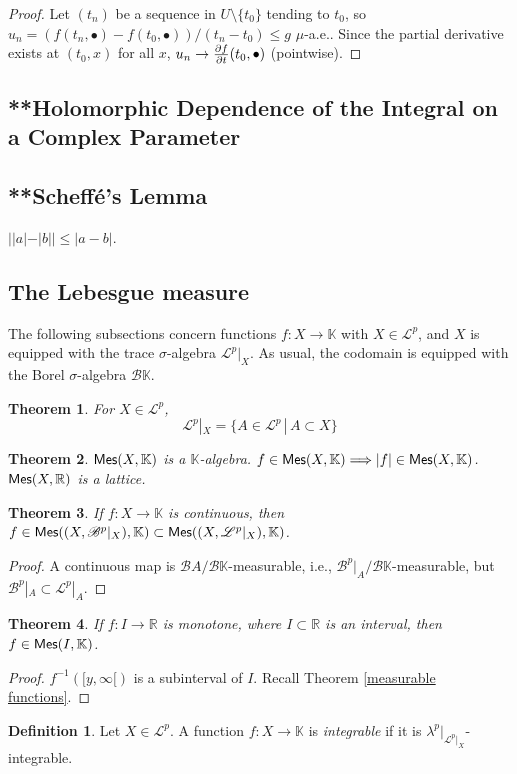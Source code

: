 \documentclass[11pt, a4paper, openany]{book}
\newtheorem{thm}{Theorem}\newtheorem{lem}{Lemma}\newtheorem{crl}{Corollary}
\theoremstyle{definition}
\newtheorem{define}{Definition}\newtheorem{exam}{Example}\newtheorem{remark}{Remark}
\newcommand{\cat}[1]{\textup{\textsf{#1}}}
\begin{document}
    \begin{proof}
        Let $(t_n)$ be a sequence in $U\setminus \{t_0\}$ tending to $t_0$, so $u_n=(f(t_n,\bullet)-f(t_0,\bullet))/(t_n-t_0)\leqslant g$ $\mu$-a.e.. Since the partial derivative exists at $(t_0,x)$ for all $x$, $u_n\to\pdv{f}{t}(t_0,\bullet)$ (pointwise).
    \end{proof}
\subsection{**Holomorphic Dependence of the Integral on a Complex Parameter}
\subsection{**Scheff\'{e}'s Lemma}
    $||a|-|b||\leqslant |a-b|$.
\subsection{The Lebesgue measure}
    The following subsections concern functions $f:X\rightarrow \mathbb{K}$ with $X\in \mathscr{L}^p$, and $X$ is equipped with the trace $\sigma$-algebra $\mathscr{L}^p|_X$. As usual, the codomain is equipped with the Borel $\sigma$-algebra $\mathscr{B}\mathbb{K}$.
    \begin{thm}
        For $X\in \mathscr{L}^p$,
        \[
            \mathscr{L}^p|_X=\{A\in \mathscr{L}^p\,|\,A\subset X\}
        \]
    \end{thm}
    \begin{thm}
        $\cat{Mes}(X,\mathbb{K})$ is a $\mathbb{K}$-algebra. $f\in \cat{Mes}(X,\mathbb{K})\Longrightarrow |f|\in \cat{Mes}(X,\mathbb{K})$. $\cat{Mes}(X,\mathbb{R})$ is a lattice. 
    \end{thm}
    \begin{thm}
        If $f:X\rightarrow \mathbb{K}$ is continuous, then $f\in\cat{Mes}((X,\mathscr{B}^p|_X),\mathbb{K})\subset\cat{Mes}((X,\mathscr{L}^p|_X),\mathbb{K})$.
    \end{thm}
    \begin{proof}
        A continuous map is $\mathscr{B}A/\mathscr{B}\mathbb{K}$-measurable, i.e., $\mathscr{B}^p|_A/\mathscr{B}\mathbb{K}$-measurable, but $\mathscr{B}^p|_A\subset \mathscr{L}^p|_A$.
    \end{proof}
    \begin{thm}
        If $f:I\rightarrow \mathbb{R}$ is monotone, where $I\subset \mathbb{R}$ is an interval, then $f\in\cat{Mes}(I,\mathbb{K})$.
    \end{thm}
    \begin{proof}
        $f^{-1}([y,\infty[)$ is a subinterval of $I$. Recall Theorem \ref{measurable functions}.
    \end{proof}
    \begin{define}
        Let $X\in\mathscr{L}^p$. A function $f:X\rightarrow\mathbb{K}$ is \textit{integrable} if it is $\lambda^p|_{\mathscr{L}^p|_X}$-integrable.
    \end{define}
\end{document}
